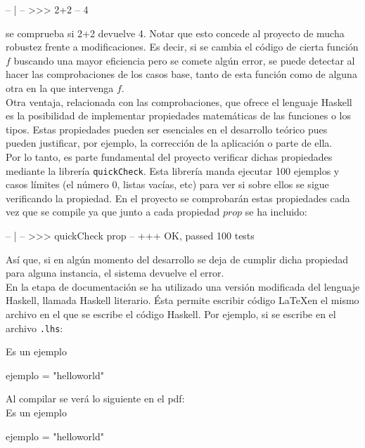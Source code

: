 \begin{code}
-- | 
-- >>> 2+2
-- 4
\end{code}

se comprueba si 2+2 devuelve 4. Notar que esto concede al proyecto de mucha robustez frente a modificaciones. Es decir, si se cambia el código de cierta función $f$ buscando una mayor eficiencia pero se comete algún error, se puede detectar al hacer las comprobaciones de los casos base, tanto de esta función como de alguna otra en la que intervenga $f$.\\

Otra ventaja, relacionada con las comprobaciones, que ofrece el lenguaje Haskell es la posibilidad de implementar propiedades matemáticas de las funciones o los tipos. Estas propiedades pueden ser esenciales en el desarrollo teórico pues pueden justificar, por ejemplo, la corrección de la aplicación o parte de ella.\\

Por lo tanto, es parte fundamental del proyecto verificar dichas propiedades mediante la librería \texttt{quickCheck}. Esta librería manda ejecutar 100 ejemplos y casos límites (el número 0, listas vacías, etc) para ver si sobre ellos se sigue verificando la propiedad. En el proyecto se comprobarán estas propiedades cada vez que se compile ya que junto a cada propiedad $prop$ se ha incluido:

\begin{code}
-- | 
-- >>> quickCheck prop
--  +++ OK, passed 100 tests
\end{code}

Así que, si en algún momento del desarrollo se deja de cumplir dicha propiedad para alguna instancia, el sistema devuelve el error.\\

En la etapa de documentación se ha utilizado una versión modificada del lenguaje Haskell, llamada Haskell literario. Ésta permite escribir código \LaTeX en el mismo archivo en el que se escribe el código Haskell. Por ejemplo, si se escribe en el archivo \texttt{.lhs}:

\begin{codigo}
Es un ejemplo
\begin{code}
ejemplo = "helloworld"
\end{code}
\end{codigo}

Al compilar se verá lo siguiente en el pdf:\\

Es un ejemplo
\begin{code}
ejemplo = "helloworld"
\end{code}

